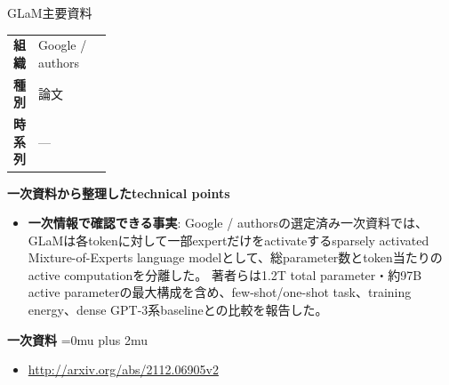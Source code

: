\begin{technicalnote}{GLaM}{主要資料}
\begingroup
\begin{tabularx}{\linewidth}{@{}>{\bfseries}p{0.22\linewidth}X@{}}
組織 & Google / authors \\
種別 & 論文 \\
時系列 & — \\
\end{tabularx}
\smallskip
{\bfseries 一次資料から整理したtechnical points}
\begin{itemize}[leftmargin=1.5em,itemsep=0.35em]
\item \textbf{一次情報で確認できる事実}: Google / authorsの選定済み一次資料では、GLaMは各tokenに対して一部expertだけをactivateするsparsely activated Mixture-of-Experts language modelとして、総parameter数とtoken当たりのactive computationを分離した。 著者らは1.2T total parameter・約97B active parameterの最大構成を含め、few-shot/one-shot task、training energy、dense GPT-3系baselineとの比較を報告した。
\end{itemize}
\begin{minipage}{\linewidth}
\begin{samepage}
{\bfseries 一次資料}
\begingroup\sloppy
\Urlmuskip=0mu plus 2mu\relax
\begin{itemize}[leftmargin=1.5em,itemsep=0.25em]
\item {\scriptsize\url{http://arxiv.org/abs/2112.06905v2}}
\end{itemize}
\endgroup
\end{samepage}
\end{minipage}
\endgroup
\end{technicalnote}
\medskip

